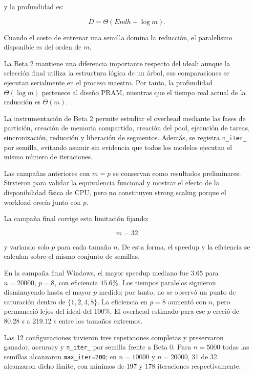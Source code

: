 \documentclass[11pt,a4paper]{article}
\begin{document}
y la profundidad es:

\begin{equation}
    D=\Theta(E n d h+\log m).
\end{equation}

Cuando el costo de entrenar una semilla domina la reducción, el paralelismo disponible
es del orden de $m$.

La Beta 2 mantiene una diferencia importante respecto del ideal: aunque la selección
final utiliza la estructura lógica de un árbol, sus comparaciones se ejecutan
serialmente en el proceso maestro. Por tanto, la profundidad $\Theta(\log m)$ pertenece
al diseño PRAM, mientras que el tiempo real actual de la reducción es $\Theta(m)$.

La instrumentación de Beta 2 permite estudiar el overhead mediante las fases de
partición, creación de memoria compartida, creación del pool, ejecución de tareas,
sincronización, reducción y liberación de segmentos. Además, se registra
\texttt{n\_iter\_} por semilla, evitando asumir sin evidencia que todos los modelos
ejecutan el mismo número de iteraciones.

Las campañas anteriores con $m=p$ se conservan como resultados preliminares. Sirvieron
para validar la equivalencia funcional y mostrar el efecto de la disponibilidad física
de CPU, pero no constituyen strong scaling porque el workload crecía junto con $p$.

La campaña final corrige esta limitación fijando:

\begin{equation}
    m=32
\end{equation}

y variando solo $p$ para cada tamaño $n$. De esta forma, el speedup y la
eficiencia se calculan sobre el mismo conjunto de semillas.

En la campaña final Windows, el mayor speedup mediano fue $3.65$ para
$n=20000$, $p=8$, con eficiencia $45.6\%$. Los tiempos paralelos siguieron
disminuyendo hasta el mayor $p$ medido; por tanto, no se observó un punto de
saturación dentro de $\{1,2,4,8\}$. La eficiencia en $p=8$ aumentó con $n$,
pero permaneció lejos del ideal del 100\%. El overhead estimado para ese $p$
creció de 80.28 s a 219.12 s entre los tamaños extremos.

Las 12 configuraciones tuvieron tres repeticiones completas y preservaron
ganador, accuracy y \texttt{n\_iter\_} por semilla frente a Beta 0. Para
$n=5000$ todas las semillas alcanzaron \texttt{max\_iter=200}; en
$n=10000$ y $n=20000$, 31 de 32 alcanzaron dicho límite, con mínimos de
197 y 178 iteraciones respectivamente.
\end{document}
